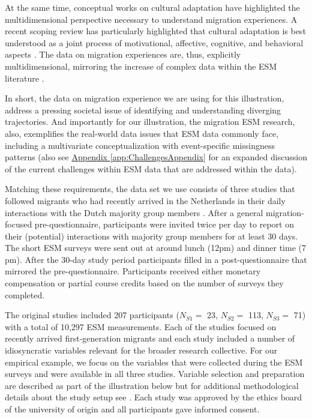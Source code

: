 \documentclass[man, 12pt, a4paper, floatsintext]{apa7}
\theoremstyle{break}
\theoremstyle{plain}
\newcommand{\appref}[2][]{\hyperref[#2]{Appendix \ref*{#2}#1}}
\begin{document}
At the same time, conceptual works on cultural adaptation have highlighted the multidimensional perspective necessary to understand migration experiences. A recent scoping review has particularly highlighted that cultural adaptation is best understood as a joint process of motivational, affective, cognitive, and behavioral aspects \citep[e.g.,][]{Kreienkamp2022d}. The data on migration experiences are, thus, explicitly multidimensional, mirroring the increase of complex data within the ESM literature \citep[][]{wardenaar2013}.

In short, the data on migration experience we are using for this illustration, address a pressing societal issue of identifying and understanding diverging trajectories. And importantly for our illustration, the migration ESM research, also, exemplifies the real-world data issues that ESM data commonly face, including a multivariate conceptualization with event-specific missingness patterns (also see \appref[]{app:ChallengesAppendix} for an expanded discussion of the current challenges within ESM data that are addressed within the data).

Matching these requirements, the data set we use consists of three
studies that followed migrants who had recently arrived in the
Netherlands in their daily interactions with the Dutch majority group
members \citep[for the data set see][]{Kreienkamp2022b}. After a general
migration-focused pre-questionnaire, participants were invited twice per
day to report on their (potential) interactions with majority group
members for at least 30 days. The short ESM surveys were sent out at
around lunch (12pm) and dinner time (7 pm). After the 30-day study
period participants filled in a post-questionnaire that mirrored the
pre-questionnaire. Participants received either monetary compensation or
partial course credits based on the number of surveys they completed.

The original studies included 207 participants (\(N_{S1}=\) 23,
\(N_{S2}=\) 113, \(N_{S3}=\) 71) with a total of 10,297 ESM
measurements. Each of the studies focused on recently arrived
first-generation migrants and each study included a number of
idiosyncratic variables relevant for the broader research collective.
For our empirical example, we focus on the variables that were collected
during the ESM surveys and were available in all three studies. Variable
selection and preparation are described as part of the illustration
below but for additional methodological details about the study setup
see \citet[][]{Kreienkamp2022b}. Each study was approved by the ethics
board of the university of origin and all participants gave informed
consent.
\end{document}
